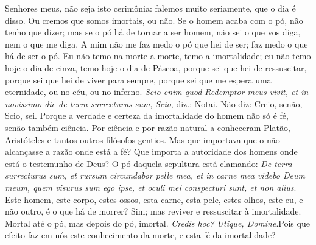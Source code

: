 Senhores meus, não seja isto cerimônia: falemos muito
seriamente, que o dia é disso. Ou cremos que somos imortais, ou não. Se
o homem acaba com o pó, não tenho que dizer; mas se o pó há de tornar a
ser homem, não sei o que vos diga, nem o que me diga. A mim não me faz
medo o pó que hei de ser; faz medo o que há de ser o pó. Eu não temo na
morte a morte, temo a imortalidade; eu não temo hoje o dia de cinza,
temo hoje o dia de Páscoa, porque sei que hei de ressuscitar, porque sei
que hei de viver para sempre, porque sei que me espera uma eternidade,
ou no céu, ou no inferno. \emph{Scio enim quod Redemptor meus vivit, et
in novissimo die de terra surrecturus sum}, \emph{Scio}, diz.: Notai.
Não diz: Creio, senão, Scio, sei. Porque a verdade e certeza da
imortalidade do homem não só é fé, senão também ciência. Por ciência e
por razão natural a conheceram Platão, Aristóteles e tantos outros
filósofos gentios. Mas que importava que o não alcançasse a razão onde
está a fé? Que importa a autoridade dos homens onde está o testemunho de
Deus? O pó daquela sepultura está clamando: \emph{De terra surrecturus
sum, et rursum circundabor pelle mea, et in carne mea videbo Deum meum,
quem visurus sum ego ipse, et oculi mei conspecturi sunt, et non alius}. Este homem, este corpo, estes ossos, esta
carne, esta pele, estes olhos, este eu, e não outro, é o que há de
morrer? Sim; mas reviver e ressuscitar à imortalidade. Mortal até o pó,
mas depois do pó, imortal. \emph{Credis hoc? Utique, Domine}.Pois que
efeito faz em nós este conhecimento da morte, e esta fé da imortalidade?

